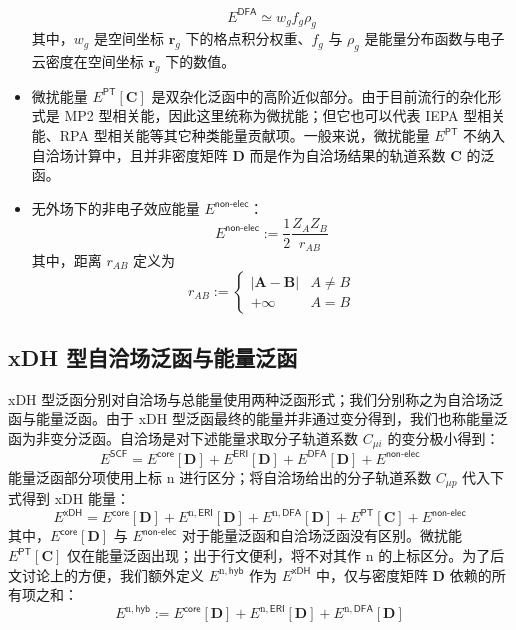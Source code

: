 \begin{itemize}[nosep]
        \begin{equation}
          E^\textsf{DFA} \simeq w_g f_g \rho_g
        \end{equation}
        其中，$w_g$ 是空间坐标 $\bm{r}_g$ 下的格点积分权重、$f_g$ 与 $\rho_g$ 是能量分布函数与电子云密度在空间坐标 $\bm{r}_g$ 下的数值。
  \item 微扰能量 $E^\textsf{PT}[\mathbf{C}]$ 是双杂化泛函中的高阶近似部分。由于目前流行的杂化形式是 MP2 型相关能，因此这里统称为微扰能；但它也可以代表 IEPA 型相关能、RPA 型相关能等其它种类能量贡献项。一般来说，微扰能量 $E^\textsf{PT}$ 不纳入自洽场计算中，且并非密度矩阵 $\mathbf{D}$ 而是作为自洽场结果的轨道系数 $\mathbf{C}$ 的泛函。
  \item 无外场下的非电子效应能量 $E^\textsf{non-elec}$：
        \begin{equation}
          E^\textsf{non-elec} := \frac{1}{2} \frac{Z_A Z_B}{r_{AB}}
        \end{equation}
        其中，距离 $r_{AB}$ 定义为
        \begin{equation*}
          r_{AB} :=
          \begin{cases}
              | \boldsymbol{A} - \boldsymbol{B} | & A \neq B \\
              + \infty & A = B
          \end{cases}
        \end{equation*}
\end{itemize}

\subsection{xDH 型自洽场泛函与能量泛函}

xDH 型泛函分别对自洽场与总能量使用两种泛函形式；我们分别称之为\textsf{自洽场泛函}与\textsf{能量泛函}。由于 xDH 型泛函最终的能量并非通过变分得到，我们也称能量泛函为非变分泛函。自洽场是对下述能量求取分子轨道系数 $C_{\mu i}$ 的变分极小得到：
\begin{equation}
  \label{eq.3.def.eng-SCF}
  E^\textsf{SCF} = E^\textsf{core} [\mathbf{D}] + E^\textsf{ERI} [\mathbf{D}] + E^\textsf{DFA} [\mathbf{D}] + E^\textsf{non-elec}
\end{equation}
能量泛函部分项使用上标 $\mathrm{n}$ 进行区分；将自洽场给出的分子轨道系数 $C_{\mu p}$ 代入下式得到 xDH 能量：
\begin{equation}
  \label{eq.3.def.eng-xDH}
  E^\textsf{xDH} = E^\textsf{core} [\mathbf{D}] + E^{\mathrm{n}, \textsf{ERI}} [\mathbf{D}] + E^{\mathrm{n}, \textsf{DFA}} [\mathbf{D}] + E^\textsf{PT} [\mathbf{C}] + E^\textsf{non-elec}
\end{equation}
其中，$E^\textsf{core} [\mathbf{D}]$ 与 $E^\textsf{non-elec}$ 对于能量泛函和自洽场泛函没有区别。微扰能 $E^\textsf{PT} [\mathbf{C}]$ 仅在能量泛函出现；出于行文便利，将不对其作 $\mathrm{n}$ 的上标区分。为了后文讨论上的方便，我们额外定义 $E^{\mathrm{n}, \textsf{hyb}}$ 作为 $E^\textsf{xDH}$ 中，仅与密度矩阵 $\mathbf{D}$ 依赖的所有项之和：
\begin{equation}
  \label{eq.3.def.eng-n-hyb}
  E^{\mathrm{n}, \textsf{hyb}} := E^\textsf{core} [\mathbf{D}] + E^{\mathrm{n}, \textsf{ERI}} [\mathbf{D}] + E^{\mathrm{n}, \textsf{DFA}} [\mathbf{D}]
\end{equation}

